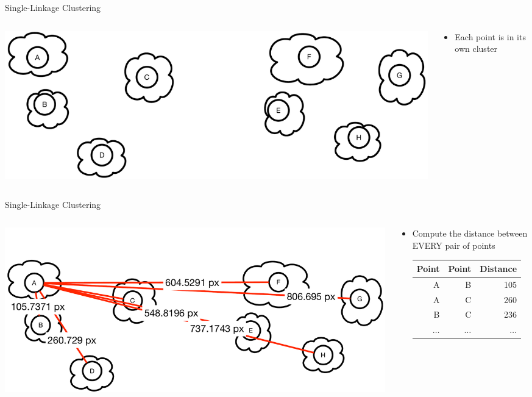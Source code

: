 \documentclass[aspectratio=169]{beamer}
\begin{document}
\begin{frame}{Single-Linkage Clustering}

\begin{columns}
\begin{column}{0.5\textwidth}
\includegraphics[width=1\textwidth]{./lectUL/minLinkageClustering1.pdf}
\end{column}
\begin{column}{0.5\textwidth}
\begin{itemize}
\item Each point is in its own cluster
\end{itemize}
\end{column}
\end{columns}
\end{frame}
\begin{frame}{Single-Linkage Clustering}

\begin{columns}
\begin{column}{0.5\textwidth}
\includegraphics[width=1\textwidth]{./lectUL/minLinkageClustering2.pdf}
\end{column}
\begin{column}{0.5\textwidth}
\begin{itemize}
\item Compute the distance between EVERY pair of points
\begin{tabular}{|r|r|r|} \hline
Point & Point & Distance \\ \hline
A & B & 105\\ \hline
A & C & 260 \\ \hline
B & C & 236 \\ \hline
$\ldots$ & $\ldots$  & $\ldots$ \\ \hline
\end{tabular}
\end{itemize}
\end{column}
\end{columns}
\end{frame}
\end{document}
